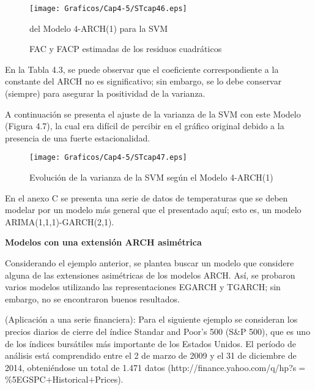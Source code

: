 \begin{figure}[H]
\centering
\texttt{[image: Graficos/Cap4-5/STcap46.eps]}
\caption{FAC y FACP estimadas de los residuos cuadr\'{a}ticos} del Modelo 4-ARCH(1) para la SVM
\end{figure}

\begin{observacion}
En la Tabla 4.3, se puede observar que el coeficiente correspondiente a la constante del ARCH no es significativo; sin embargo, se lo debe conservar (siempre) para asegurar la positividad de la varianza.
\end{observacion}


A continuaci\'{o}n se presenta el ajuste de la varianza de la SVM con este Modelo (Figura 4.7), la cual era dif\'{i}cil de percibir en el gr\'{a}fico original debido a la presencia de una fuerte estacionalidad. 

\begin{figure}[H]
\centering
\texttt{[image: Graficos/Cap4-5/STcap47.eps]}
\caption{Evoluci\'{o}n de la varianza de la SVM seg\'{u}n el Modelo 4-ARCH(1)}
\end{figure}

\begin{observacion}
En el anexo C se presenta una serie de datos de temperaturas que se deben modelar por un modelo m\'{a}s general que el presentado aqu\'{i}; esto es, un modelo ARIMA(1,1,1)-GARCH(2,1).
\end{observacion}

\textbf{Modelos con una extensi\'{o}n ARCH asim\'{e}trica}\newline

Considerando el ejemplo anterior, se plantea buscar un modelo que considere alguna de las extensiones asim\'{e}tricas de los modelos ARCH. As\'{i}, se probaron varios modelos utilizando las representaciones EGARCH y TGARCH; sin embargo, no se encontraron buenos resultados. 

\begin{ejemplo}
(Aplicaci\'{o}n a una serie financiera): Para el siguiente ejemplo se consideran los precios diarios de cierre del \'{i}ndice Standar and Poor's 500 (S{\&}P 500), que es uno de los \'{i}ndices burs\'{a}tiles m\'{a}s importante de los Estados Unidos. El per\'{i}odo de an\'{a}lisis est\'{a} comprendido entre el 2 de marzo de 2009 y el 31 de diciembre de 2014, obteni\'{e}ndose un total de 1.471 datos (http://finance.yahoo.com/q/hp?s$=${\%}5EGSPC$+$Historical$+$Prices).
\end{ejemplo}

